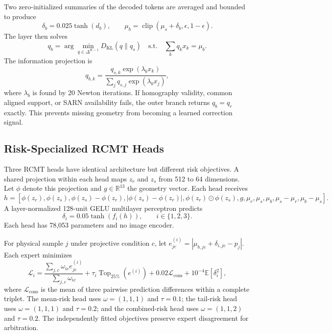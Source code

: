 \documentclass[electronics,article,submit,oneauthor]{Definitions/mdpi}
\begin{document}
Two zero-initialized summaries of the decoded tokens are averaged and bounded to produce
\begin{equation}
\delta_b=0.025\tanh(d_b),\qquad
\mu_b=\operatorname{clip}(\mu_s+\delta_b,\epsilon,1-\epsilon).
\label{eq:base_shift}
\end{equation}
The layer then solves
\begin{equation}
q_b=\arg\min_{q\in\Delta^{K-1}}D_{\mathrm{KL}}(q\|q_s)
\quad\mathrm{s.t.}\quad \sum_kq_kx_k=\mu_b.
\label{eq:base_projection}
\end{equation}
The information projection \cite{csiszar1975idivergence} is
\begin{equation}
q_{b,k}=\frac{q_{s,k}\exp(\lambda_bx_k)}{\sum_jq_{s,j}\exp(\lambda_bx_j)},
\label{eq:base_tilt}
\end{equation}
where $\lambda_b$ is found by 20 Newton iterations. If homography validity, common aligned support, or SARN availability fails, the outer branch returns $q_b=q_r$ exactly. This prevents missing geometry from becoming a learned correction signal.

\subsection{Risk-Specialized RCMT Heads}
\label{subsec:experts}

Three RCMT heads have identical architecture but different risk objectives. A shared projection within each head maps $z_r$ and $z_s$ from 512 to 64 dimensions. Let $\phi$ denote this projection and $g\in\mathbb R^{13}$ the geometry vector. Each head receives
\begin{equation}
h=\left[\phi(z_r),\phi(z_s),\phi(z_s)-\phi(z_r),|\phi(z_s)-\phi(z_r)|,
\phi(z_r)\odot\phi(z_s),g,\mu_r,\mu_s,\mu_b,\mu_s-\mu_r,\mu_b-\mu_s\right].
\label{eq:expert_relation}
\end{equation}
A layer-normalized 128-unit GELU multilayer perceptron predicts
\begin{equation}
\delta_i=0.05\tanh(f_i(h)),\qquad i\in\{1,2,3\}.
\label{eq:expert_shift}
\end{equation}
Each head has 78,053 parameters and no image encoder.

For physical sample $j$ under projective condition $c$, let $e_{jc}^{(i)}=|\mu_{b,jc}+\delta_{i,jc}-p_j|$. Each expert minimizes
\begin{equation}
\mathcal L_i=\frac{\sum_{j,c}\omega_{ic}e_{jc}^{(i)}}{\sum_{j,c}\omega_{ic}}
+\tau_i\operatorname{Top}_{25\%}(e^{(i)})
+0.02\mathcal L_{\mathrm{cons}}+10^{-4}\mathbb E[\delta_i^2],
\label{eq:expert_loss}
\end{equation}
where $\mathcal L_{\mathrm{cons}}$ is the mean of three pairwise prediction differences within a complete triplet. The mean-risk head uses $\omega=(1,1,1)$ and $\tau=0.1$; the tail-risk head uses $\omega=(1,1,1)$ and $\tau=0.2$; and the combined-risk head uses $\omega=(1,1,2)$ and $\tau=0.2$. The independently fitted objectives preserve expert disagreement for arbitration.
\end{document}
